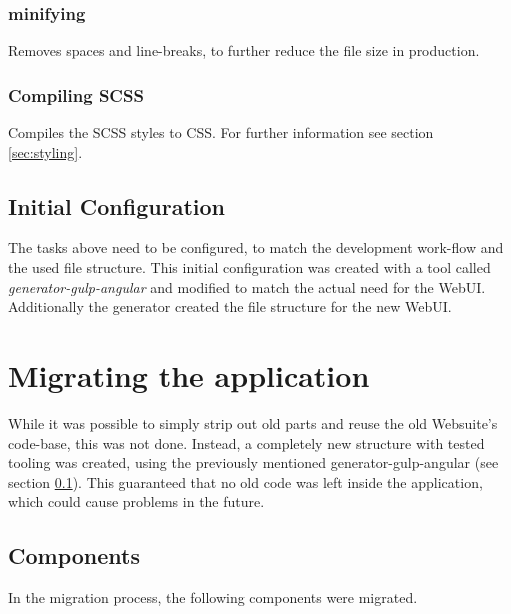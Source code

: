 \subsubsection{minifying} Removes spaces and line-breaks, to further reduce the file size in production.

\subsubsection{Compiling SCSS}
Compiles the SCSS styles to CSS. For further information see section \ref{sec:styling}.


\subsection{Initial Configuration}
\label{sec:initial_config}
The tasks above need to be configured, to match the development work-flow and the used file structure. This initial configuration was created with a tool called \textit{generator-gulp-angular} and modified to match the actual need for the WebUI. Additionally the generator created the file structure for the new WebUI.



\section{Migrating the application}
While it was possible to simply strip out old parts and reuse the old Websuite's code-base, this was not done. Instead, a completely new structure with tested tooling was created, using the previously mentioned generator-gulp-angular (see section \ref{sec:initial_config}). This guaranteed that no old code was left inside the application, which could cause problems in the future.\\


\subsection{Components}
In the migration process, the following components were migrated.


